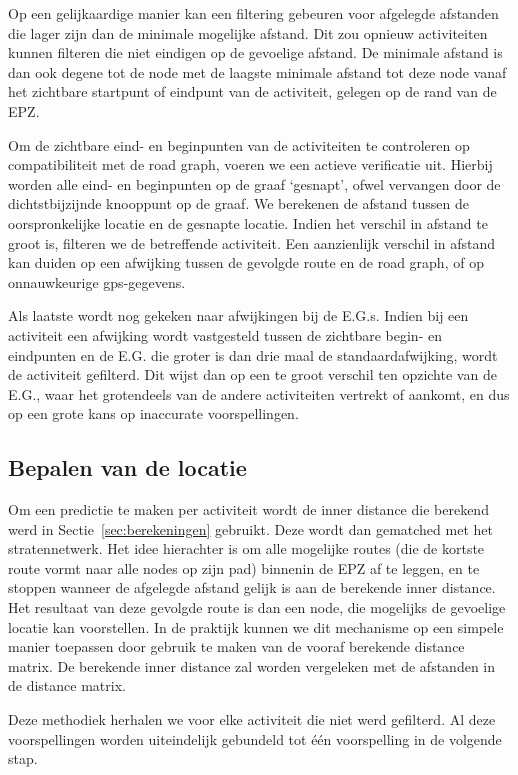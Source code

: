 Op een gelijkaardige manier kan een filtering gebeuren voor afgelegde afstanden
die lager zijn dan de minimale mogelijke afstand. Dit zou opnieuw activiteiten
kunnen filteren die niet eindigen op de gevoelige afstand. De minimale afstand
is dan ook degene tot de node met de laagste minimale afstand tot deze node
vanaf het zichtbare startpunt of eindpunt van de activiteit, gelegen op de rand
van de \ac{EPZ}.

Om de zichtbare eind- en beginpunten van de activiteiten te controleren op
compatibiliteit met de road graph, voeren we een actieve verificatie uit.
Hierbij worden alle eind- en beginpunten op de graaf `gesnapt', ofwel vervangen
door de dichtstbijzijnde knooppunt op de graaf. We berekenen de afstand tussen
de oorspronkelijke locatie en de gesnapte locatie. Indien het verschil in
afstand te groot is, filteren we de betreffende activiteit. Een aanzienlijk
verschil in afstand kan duiden op een afwijking tussen de gevolgde route en de
road graph, of op onnauwkeurige gps-gegevens.

Als laatste wordt nog gekeken naar afwijkingen bij de \acp{E.G.}. Indien bij
een activiteit een afwijking wordt vastgesteld tussen de zichtbare begin- en
eindpunten en de \ac{E.G.} die groter is dan drie maal de standaardafwijking,
wordt de activiteit gefilterd. Dit wijst dan op een te groot verschil ten
opzichte van de \ac{E.G.}, waar het grotendeels van de andere activiteiten
vertrekt of aankomt, en dus op een grote kans op inaccurate voorspellingen.

\subsection{Bepalen van de locatie}
Om een predictie te maken per activiteit wordt de inner distance die berekend
werd in Sectie~\ref{sec:berekeningen} gebruikt. Deze wordt dan gematched met
het stratennetwerk. Het idee hierachter is om alle mogelijke routes (die de
kortste route vormt naar alle nodes op zijn pad) binnenin de \ac{EPZ} af te
leggen, en te stoppen wanneer de afgelegde afstand gelijk is aan de berekende
inner distance. Het resultaat van deze gevolgde route is dan een node, die
mogelijks de gevoelige locatie kan voorstellen. In de praktijk kunnen we dit
mechanisme op een simpele manier toepassen door gebruik te maken van de vooraf
berekende distance matrix. De berekende inner distance zal worden vergeleken
met de afstanden in de distance matrix.

Deze methodiek herhalen we voor elke activiteit die niet werd gefilterd. Al
deze voorspellingen worden uiteindelijk gebundeld tot één voorspelling in de
volgende stap.

